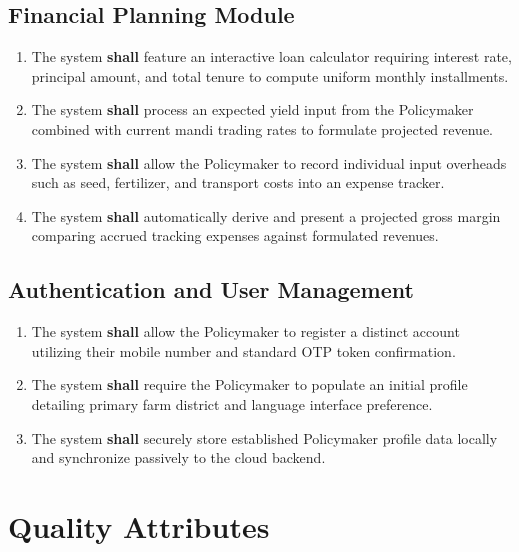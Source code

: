 \subsection{Financial Planning Module}
\begin{enumerate}
    \item The system \textbf{shall} feature an interactive loan calculator requiring interest rate, principal amount, and total tenure to compute uniform monthly installments.
    \item The system \textbf{shall} process an expected yield input from the Policymaker combined with current mandi trading rates to formulate projected revenue.
    \item The system \textbf{shall} allow the Policymaker to record individual input overheads such as seed, fertilizer, and transport costs into an expense tracker.
    \item The system \textbf{shall} automatically derive and present a projected gross margin comparing accrued tracking expenses against formulated revenues.
\end{enumerate}

\subsection{Authentication and User Management}
\begin{enumerate}
    \item The system \textbf{shall} allow the Policymaker to register a distinct account utilizing their mobile number and standard OTP token confirmation.
    \item The system \textbf{shall} require the Policymaker to populate an initial profile detailing primary farm district and language interface preference.
    \item The system \textbf{shall} securely store established Policymaker profile data locally and synchronize passively to the cloud backend.
\end{enumerate}

\section{Quality Attributes}

